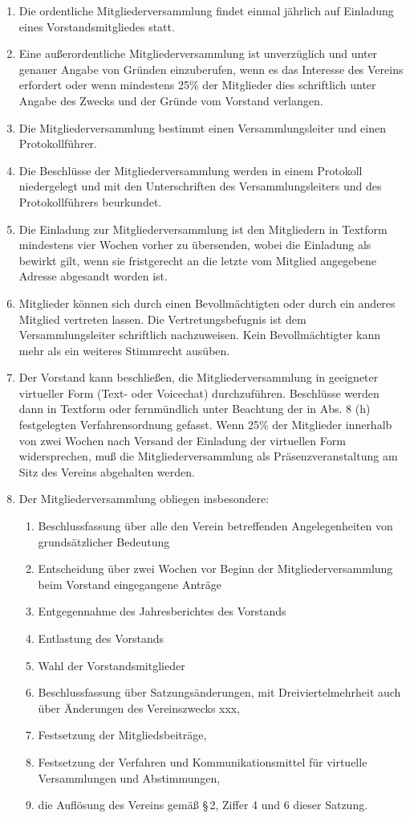 \documentclass[12pt,a4paper]{article}
\begin{document}
\begin{enumerate}
\item Die ordentliche Mitgliederversammlung findet einmal jährlich auf Einladung eines Vorstandsmitgliedes statt.
\item Eine außerordentliche Mitgliederversammlung ist unverzüglich und unter genauer Angabe von Gründen einzuberufen, wenn es das Interesse des Vereins erfordert oder wenn mindestens 25\% der Mitglieder dies schriftlich unter Angabe des Zwecks und der Gründe vom Vorstand verlangen.
\item Die Mitgliederversammlung bestimmt einen Versammlungsleiter und einen Protokollführer.
\item Die Beschlüsse der Mitgliederversammlung werden in einem Protokoll niedergelegt und mit den Unterschriften des Versammlungsleiters und des Protokollführers beurkundet.
\item Die Einladung zur Mitgliederversammlung ist den Mitgliedern in Textform mindestens vier Wochen vorher zu übersenden, wobei die Einladung als bewirkt gilt, wenn sie fristgerecht an die letzte vom Mitglied angegebene Adresse abgesandt worden ist.
\item Mitglieder können sich durch einen Bevollmächtigten oder durch ein anderes
Mitglied vertreten lassen. Die Vertretungsbefugnis ist dem Versammlungsleiter
schriftlich nachzuweisen. Kein Bevollmächtigter kann mehr als ein weiteres Stimmrecht ausüben.
\item Der Vorstand kann beschließen, die Mitgliederversammlung in geeigneter virtueller Form (Text- oder Voicechat) durchzuführen. Beschlüsse werden dann in Textform oder fernmündlich unter Beachtung der in Abs. 8 (h) festgelegten Verfahrensordnung gefasst. Wenn 25\% der Mitglieder innerhalb von zwei Wochen nach Versand der Einladung der virtuellen Form widersprechen, muß die Mitgliederversammlung als Präsenzveranstaltung am Sitz des Vereins abgehalten werden.
\item Der Mitgliederversammlung obliegen insbesondere:
\begin{enumerate}
\item Beschlussfassung über alle den Verein betreffenden Angelegenheiten von grundsätzlicher Bedeutung
\item Entscheidung über zwei Wochen vor Beginn der Mitgliederversammlung beim Vorstand eingegangene Anträge
\item Entgegennahme des Jahresberichtes des Vorstands
\item Entlastung des Vorstands
\item Wahl der Vorstandsmitglieder
\item Beschlussfassung über Satzungsänderungen, mit Dreiviertelmehrheit auch über Änderungen des Vereinszwecks xxx,
\item Festsetzung der Mitgliedsbeiträge,
\item Festsetzung der Verfahren und Kommunikationsmittel für virtuelle Versammlungen und Abstimmungen, 
\item die Auflösung des Vereins gemäß §\,2, Ziffer 4 und 6 dieser Satzung.
\end{enumerate}
\end{enumerate}
\end{document}
